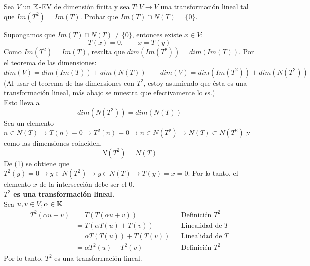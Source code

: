 \item Sea $V$ un $\mathbb{K}$-EV de dimensión finita y sea $T:V\to V$ una transformación lineal tal que $Im(T^2)=Im(T)$. Probar que $Im(T)\cap N(T)=\{0\}$.
    \begin{mdframed}[style=s]
        Supongamos que $Im(T)\cap N(T)\neq \{0\}$, entonces existe $x\in V:$
        \begin{equation}
            T(x)=0,\qquad x=T(y)
        \end{equation}
        Como $Im(T^2)=Im(T)$, resulta que $dim(Im(T^2))=dim(Im(T))$. Por el teorema de las dimensiones:
        \[dim(V)=dim(Im(T))+dim(N(T))\qquad dim(V)=dim(Im(T^2))+dim(N(T^2))\]
        (Al usar el teorema de las dimensiones con $T^2$, estoy asumiendo que ésta es una transformación lineal, más abajo se muestra que efectivamente lo es.)\\
        Esto lleva a
        \[dim(N(T^2))=dim(N(T))\]
        Sea un elemento $n\in N(T)\to T(n)=0\to T^2(n)=0\to n\in N(T^2)\to N(T)\subset N(T^2)$ y como las dimensiones coinciden,
        \[N(T^2)=N(T)\]
        De (1) se obtiene que $T^2(y)=0\to y\in N(T^2)\to y\in N(T)\to T(y)=x=0$. Por lo tanto, el elemento $x$ de la intersección debe ser el $0$.\vspace{6pt}\\
        \textbf{$T^2$ es una transformación lineal.}\\
        Sea $u,v\in V,\alpha\in\mathbb{K}$
        \begin{align*}
            T^2(\alpha u+v)&=T(T(\alpha u+v))&&\text{Definición }T^2\\
            &=T(\alpha T(u)+T(v))&&\text{Linealidad de }T\\
            &=\alpha T(T(u))+T(T(v))&&\text{Linealidad de }T\\
            &=\alpha T^2(u)+T^2(v)&&\text{Definición }T^2
        \end{align*}
        Por lo tanto, $T^2$ es una transformación lineal.
    \end{mdframed}